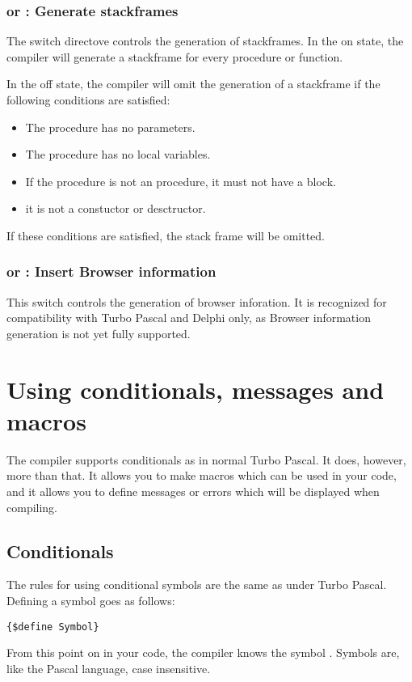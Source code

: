 \subsection{ or  : Generate stackframes}

The  switch directove controls the generation of stackframes.
In the on state, the compiler will generate a
stackframe for every procedure or function.

In the off state, the compiler will omit the generation of a stackframe if
the following conditions are satisfied:
\begin{itemize}
\item The procedure has no parameters.
\item The procedure has no local variables.
\item If the procedure is not an  procedure, it must not have
a  block.
\item it is not a constuctor or desctructor.
\end{itemize}
If these conditions are satisfied, the stack frame will be omitted.

\subsection{ or  : Insert Browser information}

This switch controls the generation of browser inforation. It is recognized
for compatibility with Turbo Pascal and Delphi only, as Browser information
generation is not yet fully supported.


\chapter{Using conditionals, messages and macros}
\label{ch:CondMessageMacro}
The \fpc compiler supports conditionals as in normal Turbo Pascal. It does,
however, more than that. It allows you to make macros which can be used in
your code, and it allows you to define messages or errors which will be
displayed when compiling.

\section{Conditionals}
\label{se:Conditionals}
The rules for using conditional symbols are the same as under Turbo Pascal.
Defining a symbol goes as follows:
\begin{verbatim}
{$define Symbol}
\end{verbatim}
From this point on in your code, the compiler knows the symbol .
Symbols are, like the Pascal language, case insensitive.

